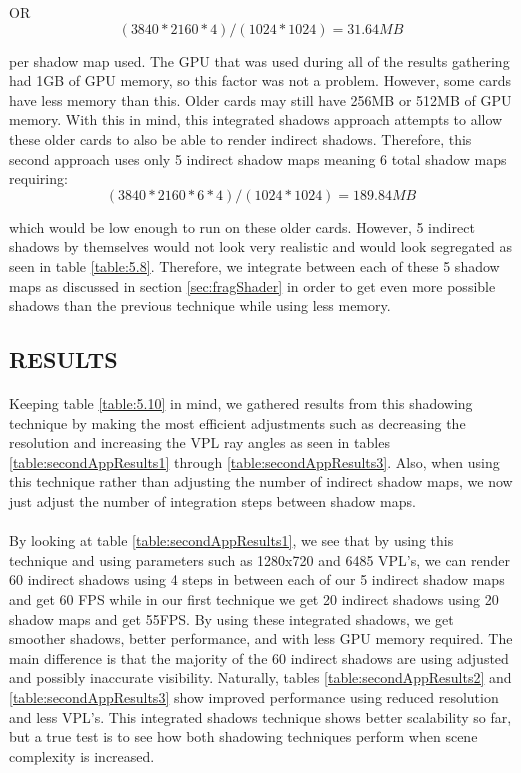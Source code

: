 OR
\begin{equation}
(3840*2160*4)/(1024*1024) = 31.64 MB
\end{equation}

per shadow map used.  The GPU that was used during all of the results gathering had 1GB of GPU memory, so this factor was not a problem.  However, some cards have less memory than this.  Older cards may still have 256MB or 512MB of GPU memory.  With this in mind, this integrated shadows approach attempts to allow these older cards to also be able to render indirect shadows.  Therefore, this second approach uses only 5 indirect shadow maps meaning 6 total shadow maps requiring:
\begin{equation}
(3840*2160*6*4)/(1024*1024) = 189.84 MB
\end{equation}

which would be low enough to run on these older cards.  However, 5 indirect shadows by themselves would not look very realistic and would look segregated as seen in table \ref{table:5.8}.  Therefore, we integrate between each of these 5 shadow maps as discussed in section \ref{sec:fragShader} in order to get even more possible shadows than the previous technique while using less memory.

\subsection{RESULTS}
\paragraph{}
Keeping table \ref{table:5.10} in mind, we gathered results from this shadowing technique by making the most efficient adjustments such as decreasing the resolution and increasing the VPL ray angles as seen in tables \ref{table:secondAppResults1} through \ref{table:secondAppResults3}.  Also, when using this technique rather than adjusting the number of indirect shadow maps, we now just adjust the number of integration steps between shadow maps.

\paragraph{}
By looking at table \ref{table:secondAppResults1}, we see that by using this technique and using parameters such as 1280x720 and 6485 VPL's, we can render 60 indirect shadows using 4 steps in between each of our 5 indirect shadow maps and get 60 FPS while in our first technique we get 20 indirect shadows using 20 shadow maps and get 55FPS.  By using these integrated shadows, we get smoother shadows, better performance, and with less GPU memory required.  The main difference is that the majority of the 60 indirect shadows are using adjusted and possibly inaccurate visibility.  Naturally, tables \ref{table:secondAppResults2} and \ref{table:secondAppResults3} show improved performance using reduced resolution and less VPL's.  This integrated shadows technique shows better scalability so far, but a true test is to see how both shadowing techniques perform when scene complexity is increased.

